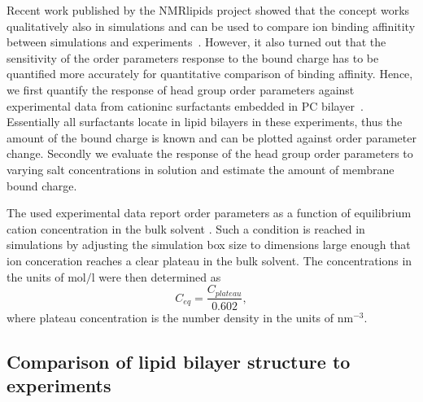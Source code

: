 \documentclass[aip,jcp,twocolumn]{revtex4}
\begin{document}
Recent work published by the NMRlipids project showed that the concept works
qualitatively also in simulations and can be used to compare ion binding
affinitity between simulations and experiments~\cite{catte16}. However,
it also turned out that the sensitivity of the order parameters response
to the bound charge has to be quantified more accurately for quantitative comparison
of binding affinity. Hence, we first quantify the response of
head group order parameters against experimental data from cationinc surfactants
embedded in PC bilayer~\cite{scherer89}. Essentially all surfactants locate in
lipid bilayers in these experiments, thus the amount of the bound charge is known
and can be plotted against order parameter change.
Secondly we evaluate the response of the head group order parameters to varying salt concentrations in solution
and estimate the amount of membrane bound charge. 



The used experimental data report order parameters as a function of
equilibrium cation concentration in the bulk solvent \cite{akutsu81,altenbach84}.
Such a condition is reached in simulations by adjusting
the simulation box size to dimensions large enough
that ion conceration reaches a clear plateau in the bulk solvent.
The concentrations in the units of $\mathrm{mol/l}$ were then 
determined as
\begin{equation}
\label{eq:conc}
  C_{eq}=\frac{C_{plateau}}{0.602},
\end{equation}
where plateau concentration is the number density in the units of $\mathrm{nm}^{-3}$.

\subsection{Comparison of lipid bilayer structure to experiments}
\end{document}
